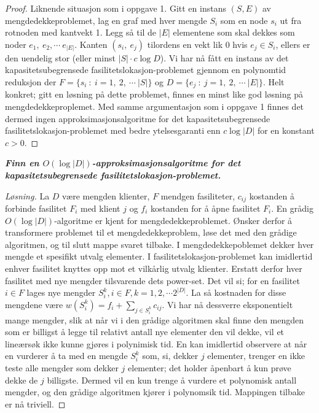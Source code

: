 \documentclass[12pt]{article}
\newenvironment{solution}{\begin{proof}[Løsning]}{\end{proof}}
\begin{document}
\begin{proof}
Liknende situasjon som i oppgave 1. Gitt en instans $(S, E)$ av mengdedekkeproblemet, lag en graf med hver mengde $S_i$ som en node $s_i$ ut fra rotnoden med kantvekt 1. Legg så til de $|E|$ elementene som skal dekkes som noder $e_1, ~e_2, \cdots ~e_{|E|}$. Kanten $(s_i, ~e_j)$ tilordens en vekt lik 0 hvis $e_j \in S_i$, ellers er den uendelig stor (eller minst $|S| \cdot c \log D$). Vi har nå fått en instans av det kapasitetsubegrensede fasilitetslokasjon-problemet gjennom en polynomtid reduksjon der $F = \{s_i ~: ~i = 1, ~2, ~\cdots ~|S|\}$ og $D = \{e_j ~: ~j = 1, ~2, ~\cdots ~|E|\}$. Helt konkret; gitt en løsning på dette problemet, finnes en minst like god løsning på mengdedekkeproplemet. Med samme argumentasjon som i oppgave 1 finnes det dermed ingen approksimasjonsalgoritme for det kapasitetsubegrensede fasilitetslokasjon-problemet med bedre ytelsesgaranti enn $c \log |D|$ for en konstant $c>0$.
\end{proof}

\it{\textbf{Finn en $O(\log |D|)$-approksimasjonsalgoritme for det kapasitetsubegrensede fasilitetslokasjon-problemet.}}

\begin{solution}
La $D$ være mengden klienter, $F$ mendgen fasiliteter, $c_{ij}$  kostanden å forbinde fasilitet $F_i$ med klient $j$ og $f_i$ kostanden for å åpne fasilitet $F_i$.
En grådig $O(\log |D|)$-algoritme er kjent for mengdedekkeproblemet. Ønsker derfor å transformere problemet til et mengdedekkeproblem, løse det med den grådige algoritmen, og til slutt mappe svaret tilbake. I mengdedekkepoblemet dekker hver mengde et spesifikt utvalg elementer. I fasilitetslokasjon-problemet kan imidlertid enhver fasilitet knyttes opp mot et vilkårlig utvalg klienter. Erstatt derfor hver fasilitet med nye mengder tilsvarende dets power-set. Det vil si; for en fasilitet $i \in F$ lages nye mengder $S_i^k, i \in F, k = 1,2, \cdots 2^{|D|}$. La så kostnaden for disse mengdene være $w(S_i^k) = f_i + \sum_{j \in S_i^k} c_{ij}$. Vi har nå dessverre eksponentielt mange mengder, slik at når vi i den grådige algoritmen skal finne den mengden som er billigst å legge til relativt antall nye elementer den vil dekke, vil et lineærsøk ikke kunne gjøres i polynimisk tid. En kan imidlertid observere at når en vurderer å ta med en mengde $S_i^k$ som, si, dekker $j$ elementer, trenger en ikke teste alle mengder som dekker $j$ elementer; det holder åpenbart å kun prøve dekke de $j$ billigste. Dermed vil en kun trenge å vurdere et polynomisk antall mengder, og den grådige algoritmen kjører i polynomsik tid. Mappingen tilbake er nå triviell.
\end{solution}
\end{document}
